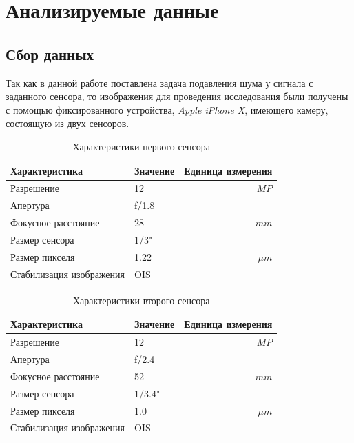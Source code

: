 \section{Анализируемые данные}\label{sec:our_data}
\subsection{Сбор данных}
Так как в данной работе поставлена задача подавления шума у сигнала с заданного сенсора, то изображения для проведения исследования были получены с помощью фиксированного устройства, \textit{Apple iPhone X}, имеющего камеру, состоящую из двух сенсоров.

\begin{table}[h!]
	\centering
	\caption{\label{tab:cam1}Характеристики первого сенсора}
	\begin{tabular}{llr}
		\toprule
		Характеристика  & Значение    & Единица измерения \\
		\midrule
		Разрешение & 12    & $MP$  \\
		Апертура & f/1.8 & \\
		Фокусное расстояние & 28 & $mm$ \\
		Размер сенсора & 1/3" & \\
		Размер пикселя & 1.22 & $\mu m$ \\
		Стабилизация изображения & OIS & \\
		\bottomrule
	\end{tabular}
\end{table}

\begin{table}[h!]
	\centering
	\caption{\label{tab:cam2}Характеристики второго сенсора}
	\begin{tabular}{llr}
		\toprule
		Характеристика  & Значение    & Единица измерения \\
		\midrule
		Разрешение & 12    & $MP$  \\
		Апертура & f/2.4 & \\
		Фокусное расстояние & 52 & $mm$ \\
		Размер сенсора & 1/3.4" & \\
		Размер пикселя & 1.0 & $\mu m$ \\
		Стабилизация изображения & OIS & \\
		\bottomrule
	\end{tabular}
\end{table}

